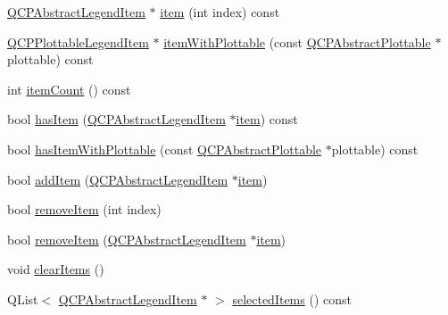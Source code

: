 \begin{DoxyCompactItemize}
\item 
\hyperlink{classQCPAbstractLegendItem}{Q\+C\+P\+Abstract\+Legend\+Item} $\ast$ \hyperlink{classQCPLegend_a454272d7094437beb3278a2294006da5}{item} (int index) const 
\item 
\hyperlink{classQCPPlottableLegendItem}{Q\+C\+P\+Plottable\+Legend\+Item} $\ast$ \hyperlink{classQCPLegend_a5ee80cf83f65e3b6dd386942ee3cc1ee}{item\+With\+Plottable} (const \hyperlink{classQCPAbstractPlottable}{Q\+C\+P\+Abstract\+Plottable} $\ast$plottable) const 
\item 
int \hyperlink{classQCPLegend_a198228e9cdc78d3a3c306fa6763d0404}{item\+Count} () const 
\item 
bool \hyperlink{classQCPLegend_a380dd19eb631592e1ebb9b24cc5b398a}{has\+Item} (\hyperlink{classQCPAbstractLegendItem}{Q\+C\+P\+Abstract\+Legend\+Item} $\ast$\hyperlink{classQCPLegend_a454272d7094437beb3278a2294006da5}{item}) const 
\item 
bool \hyperlink{classQCPLegend_a2eb1d24bdf5658e64962a656303fd61a}{has\+Item\+With\+Plottable} (const \hyperlink{classQCPAbstractPlottable}{Q\+C\+P\+Abstract\+Plottable} $\ast$plottable) const 
\item 
bool \hyperlink{classQCPLegend_a3ab274de52d2951faea45a6d975e6b3f}{add\+Item} (\hyperlink{classQCPAbstractLegendItem}{Q\+C\+P\+Abstract\+Legend\+Item} $\ast$\hyperlink{classQCPLegend_a454272d7094437beb3278a2294006da5}{item})
\item 
bool \hyperlink{classQCPLegend_ac91595c3eaa746fe6321d2eb952c63bb}{remove\+Item} (int index)
\item 
bool \hyperlink{classQCPLegend_a2aea4ec6da2d454dd0b241a254d65082}{remove\+Item} (\hyperlink{classQCPAbstractLegendItem}{Q\+C\+P\+Abstract\+Legend\+Item} $\ast$\hyperlink{classQCPLegend_a454272d7094437beb3278a2294006da5}{item})
\item 
void \hyperlink{classQCPLegend_a24795c7250eb5214fcea16b7217b4dfb}{clear\+Items} ()
\item 
Q\+List$<$ \hyperlink{classQCPAbstractLegendItem}{Q\+C\+P\+Abstract\+Legend\+Item} $\ast$ $>$ \hyperlink{classQCPLegend_ac93eaf236e911d67aa8b88942ef45c5e}{selected\+Items} () const 
\end{DoxyCompactItemize}
